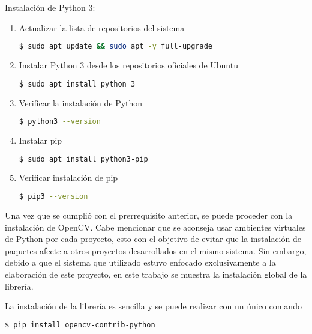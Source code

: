 Instalación de Python 3:
\begin{enumerate}
    \item Actualizar la lista de repositorios del sistema

    \begin{lstlisting}[language = bash]
        $ sudo apt update && sudo apt -y full-upgrade
    \end{lstlisting}
    
    \item Instalar Python 3 desde los repositorios oficiales de Ubuntu

    \begin{lstlisting}[language = bash]
        $ sudo apt install python 3
    \end{lstlisting}

    \item Verificar la instalación de Python

    \begin{lstlisting}[language = bash]
        $ python3 --version 
    \end{lstlisting}

    \item Instalar pip 

    \begin{lstlisting}[language = bash]
        $ sudo apt install python3-pip
    \end{lstlisting}

    \item Verificar instalación de pip

    \begin{lstlisting}[language = bash]
        $ pip3 --version
    \end{lstlisting}
\end{enumerate}

Una vez que se cumplió con el prerrequisito anterior, se puede proceder con la instalación de OpenCV. Cabe mencionar que se aconseja usar ambientes virtuales de Python por cada proyecto, esto con el objetivo de evitar que la instalación de paquetes afecte a otros proyectos desarrollados en el mismo sistema. Sin embargo, debido a que el sistema que utilizado estuvo enfocado exclusivamente a la elaboración de este proyecto, en este trabajo se muestra la instalación global de la librería.

La instalación de la librería es sencilla y se puede realizar con un único comando

\begin{lstlisting}[language = bash]
    $ pip install opencv-contrib-python
\end{lstlisting}


